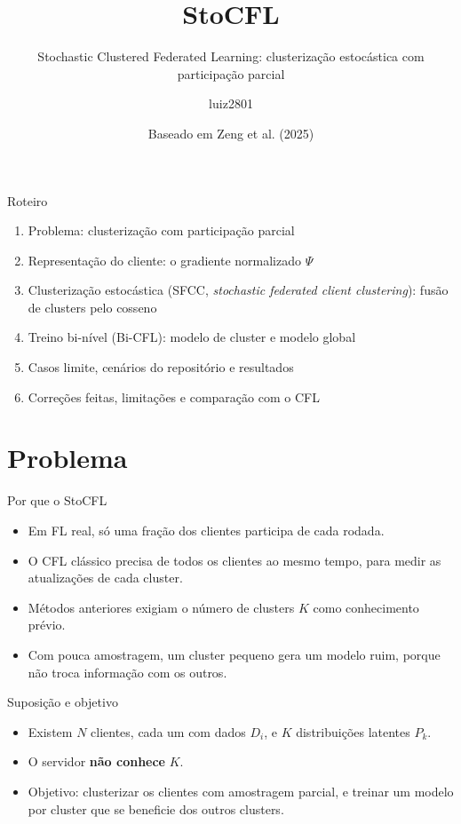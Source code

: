 \documentclass[aspectratio=169]{beamer}
\title{StoCFL}
\subtitle{Stochastic Clustered Federated Learning: clusterização estocástica com participação parcial}
\author{luiz2801}
\institute{Repositório \texttt{cfl\_stocfl}}
\date{Baseado em Zeng et al. (2025)}
\begin{document}
\begin{frame}
  \titlepage
\end{frame}

\begin{frame}{Roteiro}
  \begin{enumerate}
    \item Problema: clusterização com participação parcial
    \item Representação do cliente: o gradiente normalizado $\Psi$
    \item Clusterização estocástica (SFCC, \emph{stochastic federated client clustering}): fusão de clusters pelo cosseno
    \item Treino bi-nível (Bi-CFL): modelo de cluster e modelo global
    \item Casos limite, cenários do repositório e resultados
    \item Correções feitas, limitações e comparação com o CFL
  \end{enumerate}
\end{frame}

\section{Problema}

\begin{frame}{Por que o StoCFL}
  \begin{itemize}
    \item Em FL real, só uma fração dos clientes participa de cada rodada.
    \item O CFL clássico precisa de todos os clientes ao mesmo tempo, para medir as atualizações
      de cada cluster.
    \item Métodos anteriores exigiam o número de clusters $K$ como conhecimento prévio.
    \item Com pouca amostragem, um cluster pequeno gera um modelo ruim, porque não troca
      informação com os outros.
  \end{itemize}
\end{frame}

\begin{frame}{Suposição e objetivo}
  \begin{itemize}
    \item Existem $N$ clientes, cada um com dados $D_i$, e $K$ distribuições latentes $P_k$.
    \item O servidor \textbf{não conhece} $K$.
    \item Objetivo: clusterizar os clientes com amostragem parcial, e treinar um modelo por cluster
      que se beneficie dos outros clusters.
  \end{itemize}
\end{frame}
\end{document}

